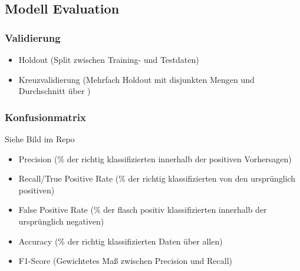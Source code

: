 \documentclass[a4paper]{article}
\begin{document}
\begin{landscape}
\begin{multicols}{3}
        \subsection{Modell Evaluation}
        \subsubsection{Validierung}
        \begin{itemize}[noitemsep,nolistsep]
            \item Holdout (Split zwischen Training- und Testdaten)
            \item Kreuzvalidierung (Mehrfach Holdout mit disjunkten Mengen und Durchschnitt über )
        \end{itemize}

        \subsubsection{Konfusionmatrix}
        Siehe Bild im Repo
        \begin{itemize}[noitemsep,nolistsep]
            \item Precision (\% der richtig klassifizierten innerhalb der positiven Vorhersagen)
            \item Recall/True Positive Rate (\% der richtig klassifizierten von den ursprünglich positiven)
            \item False Positive Rate (\% der flasch positiv klassifizierten innerhalb der ursprünglich negativen)
            \item Accuracy (\% der richtig klassifizierten Daten über allen)
            \item F1-Score (Gewichtetes Maß zwischen Precision und Recall)
        \end{itemize}


\end{multicols}
\end{landscape}
\end{document}
